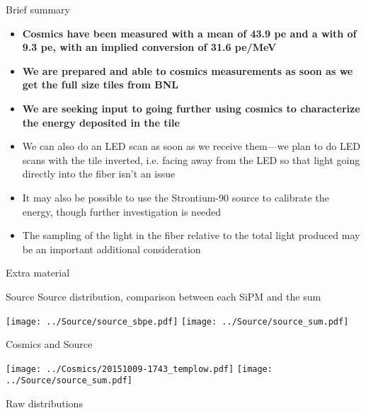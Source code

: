 \documentclass[compress,8pt]{beamer} %
\begin{document}
\begin{frame}{Brief summary}
\begin{itemize}
\item \textbf{Cosmics have been measured with a mean of 43.9 pe and a with of 9.3 pe,
with an implied conversion of 31.6 pe/MeV}
\item \textbf{We are prepared and able to cosmics measurements as soon as we get the full size tiles from BNL}
\item \textbf{We are seeking input to going further using cosmics to characterize the energy deposited in the tile}
\item We can also do an LED scan as soon as we receive them---we plan to do LED scans with the tile inverted,
i.e. facing away from the LED so that light going directly into the fiber isn't an issue
\item It may also be possible to use the Strontium-90 source to calibrate the energy, though further investigation is needed
\item The sampling of the light in the fiber relative to the total light produced may be an important additional consideration
\end{itemize}
\end{frame}



\begin{frame}
Extra material
\end{frame}


\begin{frame}{Source}
Source distribution, comparison between each SiPM and the sum
\begin{adjustwidth}{-2em}{-2em}
\begin{center}
\texttt{[image: ../Source/source\_sbpe.pdf]}
\texttt{[image: ../Source/source\_sum.pdf]}
\end{center}
\end{adjustwidth}
\end{frame}



\begin{frame}{Cosmics and Source}
\begin{adjustwidth}{-2em}{-2em}
\begin{center}
\texttt{[image: ../Cosmics/20151009-1743\_templow.pdf]}
\texttt{[image: ../Source/source\_sum.pdf]}
\end{center}
\end{adjustwidth}
Raw distributions
\end{frame}
\end{document}
